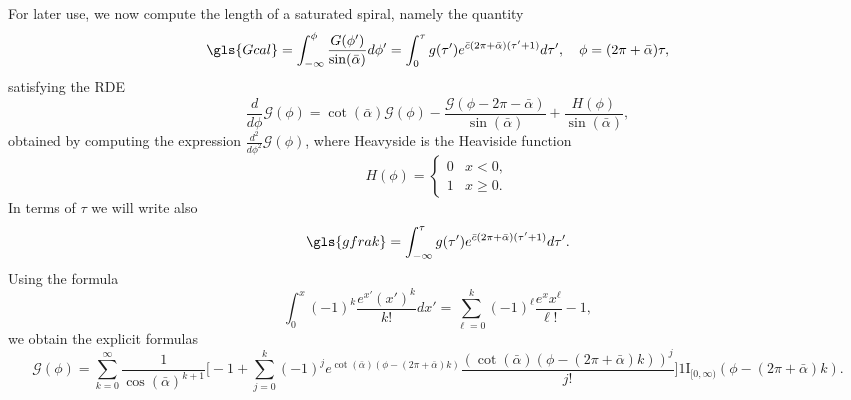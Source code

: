 \documentclass[reqno]{amsart}
\theoremstyle{definition} \newtheorem{definition}{Definition}[section]
\theoremstyle{definition} \newtheorem{remark}[definition]{Remark}
\theoremstyle{plain} \newtheorem{lemma}[definition]{Lemma}
\theoremstyle{plain} \newtheorem{proposition}[definition]{Proposition}
\theoremstyle{plain} \newtheorem{theorem}[definition]{Theorem}
\theoremstyle{plain} \newtheorem{corollary}[definition]{Corollary}
\theoremstyle{definition} \newtheorem{example}[definition]{Example}
\theoremstyle{plain} \newtheorem{claim}[clai]{Claim}
\theoremstyle{definition} \newtheorem{assumption}[definition]{Assumption}
\theoremstyle{definition} \newtheorem{observation}[definition]{Observation}
\newcommand{\ind}{1\!\!\mathrm{I}}
\newcommand{\1}{\mathbbm 1}
\numberwithin{equation}{section} %
\theoremstyle{plain} \newtheorem*{theorem*}{Theorem}
\theoremstyle{plain} \newtheorem{mthm}[maintheorem]{Main Theorem}
\theoremstyle{plain} \newtheorem*{mthm*}{Main Theorem}
\theoremstyle{plain} \newtheorem*{conjecture*}{Conjecture}
\theoremstyle{plain} \newtheorem{conjecture}[definition]{Conjecture}
\theoremstyle{plain} \newtheorem*{problem*}{Problem}
\begin{document}
For later use, we now compute the length of a saturated spiral, namely the quantity %
 
\begin{equation*}
\gls{Gcal} = \int_{-\infty}^\phi \frac{G(\phi')}{\sin(\bar \alpha)} d\phi' = \int_{0}^{\tau} g(\tau') e^{\bar c(2\pi + \bar \alpha) (\tau' + 1)} d\tau', \quad \phi = (2\pi + \bar \alpha) \tau,
\end{equation*}
satisfying the RDE 
\begin{equation}
\label{Equa:eq_for_calG}
\frac{d}{d\phi} \mathcal G(\phi) = \cot(\bar \alpha) \mathcal G(\phi) - \frac{\mathcal G(\phi - 2\pi - \bar \alpha)}{\sin(\bar \alpha)} + \frac{H(\phi)}{\sin(\bar \alpha)},
\end{equation}
obtained by computing the expression $\frac{d^2}{d\phi^2}\mathcal{G}(\phi)$, 
where \gls{Heavyside} is the Heaviside function
\begin{equation*}
H(\phi) = \begin{cases}
0 & x < 0, \\
1 & x \geq 0.
\end{cases}
\end{equation*}
In terms of $\tau$ we will write also 
\begin{equation*}
\gls{gfrak} = \int_{-\infty}^\tau g(\tau') e^{\bar c (2\pi + \bar \alpha)(\tau'+1)} d\tau'.
\end{equation*}
Using the formula
\begin{equation*}
\int_0^x (-1)^k \frac{e^{x'} (x')^k}{k!} dx'= \sum_{\ell = 0}^k (-1)^\ell \frac{e^x x^\ell}{\ell!} - 1,
\end{equation*}
we obtain the explicit formulas
\begin{equation*}
\mathcal G(\phi) = \sum_{k=0}^\infty \frac{1}{\cos(\bar\alpha)^{k+1}} \bigg[ - 1 + \sum_{j = 0}^k (-1)^j e^{\cot(\bar\alpha) (\phi - (2\pi + \bar\alpha)k)} \frac{(\cot(\bar\alpha) (\phi - (2\pi +\bar \alpha) k))^j}{j!} \bigg] \ind_{[0,\infty)}(\phi - (2\pi +\bar \alpha) k).
\end{equation*}
\end{document}

